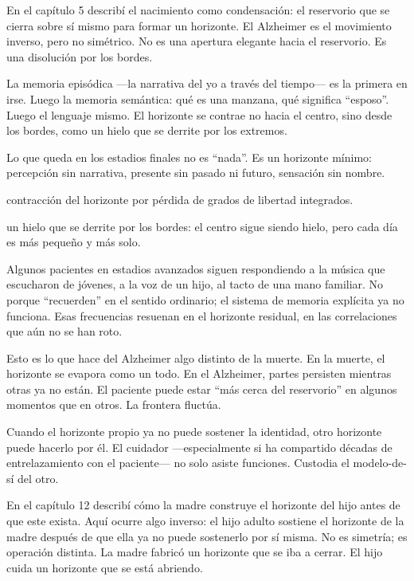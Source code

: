 \noindent En el capítulo 5 describí el nacimiento como condensación: el reservorio que se cierra sobre sí mismo para formar un horizonte. El Alzheimer es el movimiento inverso, pero no simétrico. No es una apertura elegante hacia el reservorio. Es una disolución por los bordes.

La memoria episódica —la narrativa del yo a través del tiempo— es la primera en irse. Luego la memoria semántica: qué es una manzana, qué significa “esposo”. Luego el lenguaje mismo. El horizonte se contrae no hacia el centro, sino desde los bordes, como un hielo que se derrite por los extremos.

Lo que queda en los estadios finales no es “nada”. Es un horizonte mínimo: percepción sin narrativa, presente sin pasado ni futuro, sensación sin nombre.

\begin{fisica}
 contracción del horizonte por pérdida de grados de libertad integrados.

 un hielo que se derrite por los bordes: el centro sigue siendo hielo, pero cada día es más pequeño y más solo.
\end{fisica}
Algunos pacientes en estadios avanzados siguen respondiendo a la música que escucharon de jóvenes, a la voz de un hijo, al tacto de una mano familiar. No porque “recuerden” en el sentido ordinario; el sistema de memoria explícita ya no funciona. Esas frecuencias resuenan en el horizonte residual, en las correlaciones que aún no se han roto.

Esto es lo que hace del Alzheimer algo distinto de la muerte. En la muerte, el horizonte se evapora como un todo. En el Alzheimer, partes persisten mientras otras ya no están. El paciente puede estar “más cerca del reservorio” en algunos momentos que en otros. La frontera fluctúa.

\noindent Cuando el horizonte propio ya no puede sostener la identidad, otro horizonte puede hacerlo por él. El cuidador —especialmente si ha compartido décadas de entrelazamiento con el paciente— no solo asiste funciones. Custodia el modelo-de-sí del otro.

En el capítulo 12 describí cómo la madre construye el horizonte del hijo antes de que este exista. Aquí ocurre algo inverso: el hijo adulto sostiene el horizonte de la madre después de que ella ya no puede sostenerlo por sí misma. No es simetría; es operación distinta. La madre fabricó un horizonte que se iba a cerrar. El hijo cuida un horizonte que se está abriendo.

